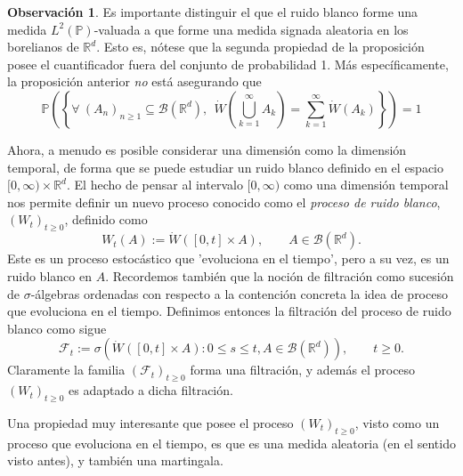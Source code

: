 \documentclass[letterpaper,twoside,12pt]{book}
\newcommand{\R}{\mathbb{R}}
\newcommand{\F}{\mathcal{F}}
\newcommand{\B}{\mathcal{B}}
\renewcommand{\P}{\mathbb{P}}
\newcommand{\W}{\dot{W}}
\newcommand{\1}{\mathds{1}}
\theoremstyle{definition}
\theoremstyle{definition}
\theoremstyle{definition}
\theoremstyle{definition}
\theoremstyle{definition}
\newtheorem{obs}{Observación}
\theoremstyle{definition}
\theoremstyle{definition}
\begin{document}
  \begin{obs}
    Es importante distinguir el que el ruido blanco forme una medida $L^{2}(\P)$-valuada a que forme una medida signada aleatoria en los borelianos de $\R^d$. Esto es, nótese que la segunda propiedad de la proposición posee el cuantificador fuera del conjunto de probabilidad 1. Más específicamente, la proposición anterior \textit{no} está asegurando que 
    \[
    \P\left(\left\{\forall \ (A_n)_{n\geq1}\subseteq\B(\R^{d}), \ \ \W \left(\bigcup_{k=1}^\infty A_k\right)=\sum_{k=1}^{\infty}\W(A_k)\right\}\right)=1  
    \]
 \end{obs}
Ahora, a menudo es posible considerar una dimensión como la dimensión temporal, de forma que se puede estudiar un ruido blanco definido en el espacio $[0,\infty)\times\R^{d}$. El hecho de pensar al intervalo $[0,\infty)$ como una dimensión temporal nos permite definir un nuevo proceso conocido como el \textit{proceso de ruido blanco}, $(W_t)_{t\geq0}$, definido como 
\[
W_t(A):=\W \left([0,t]\times A\right), \qquad A\in \B(\R^{d}).    
\]
Este es un proceso estocástico que 'evoluciona en el tiempo', pero a su vez, es un ruido blanco en $A$. Recordemos también que la noción de filtración como sucesión de $\sigma$-álgebras ordenadas con respecto a la contención concreta la idea de proceso que evoluciona en el tiempo. Definimos entonces la filtración del proceso de ruido blanco como sigue
\[
\F_t:=\sigma \left(\W([0,t]\times A):0\leq s\leq t, A\in \B(\R^{d})\right), \qquad t\geq0.    
\]
Claramente la familia $(\F_t)_{t\geq0}$ forma una filtración, y además el proceso $(W_t)_{t\geq0}$ es adaptado a dicha filtración.

Una propiedad muy interesante que posee el proceso $(W_t)_{t\geq0}$, visto como un proceso que evoluciona en el tiempo, es que es una medida aleatoria (en el sentido visto antes), y también una martingala. 
\end{document}
